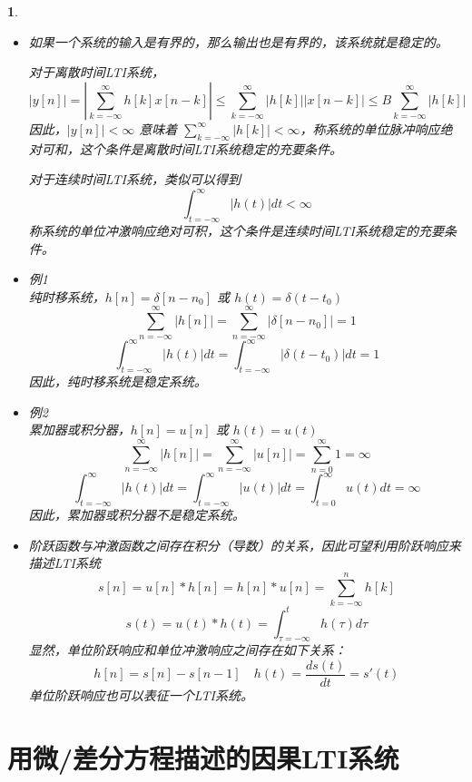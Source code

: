 \documentclass[UTF8]{report}
\theoremstyle{MyLineTheoremStyle} %
\theoremstyle{MyBlockTheoremStyle} %
\theoremstyle{MySubsubsectionStyle} %
\newtheorem{definition}{}
\begin{document}
\begin{definition}
\begin{itemize}
    \item 如果一个系统的输入是有界的，那么输出也是有界的，该系统就是稳定的。
    
    对于离散时间LTI系统，
    \[
    |y[n]| = |\sum_{k=-\infty}^{\infty} h[k] x[n - k]| \leq \sum_{k=-\infty}^{\infty} |h[k]| |x[n - k]| \leq B \sum_{k=-\infty}^{\infty} |h[k]|
    \]
    因此，$|y[n]| < \infty$ 意味着 $\sum_{k=-\infty}^{\infty} |h[k]| < \infty$，称系统的单位脉冲响应绝对可和，这个条件是离散时间LTI系统稳定的充要条件。
    
    对于连续时间LTI系统，类似可以得到
    \[
    \int_{t = -\infty}^{\infty} |h(t)| dt < \infty
    \]
    称系统的单位冲激响应绝对可积，这个条件是连续时间LTI系统稳定的充要条件。
 
        \item 例1\\
    纯时移系统，$h[n] = \delta[n - n_0]$ 或 $h(t) = \delta(t - t_0)$
    \[
    \sum_{n=-\infty}^{\infty} |h[n]| = \sum_{n=-\infty}^{\infty} |\delta[n - n_0]| = 1
    \]
    \[
    \int_{t = -\infty}^{\infty} |h(t)| dt = \int_{t = -\infty}^{\infty} |\delta(t - t_0)| dt = 1
    \]
    因此，纯时移系统是稳定系统。
    
    \item 例2\\
    累加器或积分器，$h[n] = u[n]$ 或 $h(t) = u(t)$
    \[
    \sum_{n=-\infty}^{\infty} |h[n]| = \sum_{n=-\infty}^{\infty} |u[n]| = \sum_{n=0}^{\infty} 1 = \infty
    \]
    \[
    \int_{t = -\infty}^{\infty} |h(t)| dt = \int_{t = -\infty}^{\infty} |u(t)| dt = \int_{t = 0}^{\infty} u(t) dt = \infty
    \]
    因此，累加器或积分器不是稳定系统。
    \end{itemize}
    
    \vspace{1em}
    \raggedright
    \makebox[0pt][l]{\textbf{\textcolor{red}{单位阶跃响应}}}
    \begin{itemize}
    \item 阶跃函数与冲激函数之间存在积分（导数）的关系，因此可望利用阶跃响应来描述LTI系统
    \[
    s[n] = u[n] * h[n] = h[n] * u[n] = \sum_{k=-\infty}^{n} h[k]
    \]
    \[
    s(t) = u(t) * h(t) = \int_{\tau = -\infty}^{t} h(\tau) d\tau
    \]
    显然，单位阶跃响应和单位冲激响应之间存在如下关系：
    \[
    h[n] = s[n] - s[n - 1] \quad h(t) = \frac{ds(t)}{dt}  = s'(t)
    \]
    单位阶跃响应也可以表征一个LTI系统。
    \end{itemize}
\end{definition}

\section{用微/差分方程描述的因果LTI系统}
\end{document}
